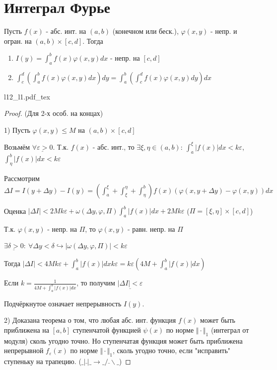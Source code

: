 \documentclass{article}
\newcommand{\incfig}[2][1]{%
    \def\svgwidth{#1\columnwidth}
    \hbox{{#2.pdf_tex}}
}
\theoremstyle{definition}
\numberwithin{theorem}{section}
\numberwithin{lemma}{section}
\numberwithin{definition}{section}
\numberwithin{corollary}{section}
\numberwithin{equation}{section}
\let\phi\varphi
\let\epsilon\varepsilon
\let\true\hookrightarrow
\begin{document}
\section{Интеграл Фурье}
\begin{lemma}
  Пусть $f(x)$ - абс. инт. на $(a,b)$ (конечном или беск.), $\phi(x,y)$ - непр. и огран.
  на $(a,b)\times [c,d]$. Тогда
  \begin{enumerate}
    \item $I(y)=\int_{a}^{b}f(x)\phi(x,y)dx$ - непр. на $[c,d]$
    \item $\int_{c}^{d}(\int_{a}^{b}f(x)\phi(x,y)dx)dy=\int_{a}^{b}(\int_{c}^{d}f(x)\phi(x,y)dy)dx$
  \end{enumerate}
\end{lemma}
\incfig{l12_l1}
\begin{proof}(Для 2-х особ. на концах)

  1) Пусть $\phi(x,y)\le M$ на $(a,b)\times [c,d]$

  Возьмём $\underline{\forall \epsilon > 0}$. Т.к. $f(x)$ - абс. инт., то
  $\exists \xi, \eta \in (a,b): \ \int_{a}^{\xi}|f(x)|dx < k \epsilon$,
  $\int_{\eta}^{b}|f(x)|dx < k \epsilon$

  Рассмотрим $\Delta I =I(y+\Delta y) - I(y) = (\int_{a}^{\xi}+\int_{\xi}^{\eta}+\int_{\eta}^{b})f(x)(\phi(x,y+\Delta y) - \phi(x,y))dx$

  Оценка $|\Delta I| < 2Mk\epsilon + \omega(\Delta y, \phi, \Pi) \int_{a}^{b}|f(x)|dx + 2Mk\epsilon$ ($\Pi = [\xi,\eta]\times [c,d]$)

  Т.к. $\phi(x,y)$ - непр. на $\Pi$, то $\phi(x,y)$ - равн. непр. на $\Pi$

  $\underline{\exists \delta >0}: \ \forall \Delta y < \delta \true |\omega(\Delta y, \phi, \Pi)| < k\epsilon$
  
  Тогда $|\Delta I|< 4Mk\epsilon + \int_{a}^{b}|f(x)|dx k\epsilon = k\epsilon(4M+\int_{a}^{b}|f(x)|dx)$
  
  Если $k=\frac{1}{4M + \int_{a}^{b}|f(x)|dx}$, то получим $\underline{|\Delta I| < \epsilon}$

  Подчёркнутое означает непрерывность $I(y)$.

  2) Доказана теорема о том, что любая абс. инт. функция $f(x)$ может быть приближена на $[a,b]$
  ступенчатой функцией $\psi(x)$ по норме $\Vert \cdot \Vert_{1}$ (интеграл от модуля) сколь 
  угодно точно. Но ступенчатая функция может быть приближена непрерывной $f_{\epsilon}(x)$ по норме
  $\Vert \cdot \Vert_{1}$, сколь угодно точно, если "исправить" ступеньку на трапецию.
  ($\_|\bar{}|\_ \rightarrow \_/\bar{}\backslash \_$)


\end{proof}
\end{document}
